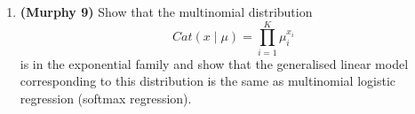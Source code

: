 \documentclass[letter,11pt]{article}
\newenvironment{solution}{
    \vspace{0.16in} {\bf Solution:}
    
}{
	\vspace{0.16in}
}
\begin{document}
\begin{enumerate}
\begin{solution}
        \begin{align*}
            Var(\theta; a, b) &= \mathbb{E}(\theta^2) - \mathbb{E}(\theta)^2 \\
                &= \int_0^1 \frac{\Gamma(a + b)}{\Gamma(a) \Gamma(b)} \theta^a (1 - \theta)^{b - 1} \dd{\theta} - \frac{a^2}{(a + b)^2} \\
                &= \left(\frac{\Gamma(a + 2)\Gamma(b)}{\Gamma(a + 2 + b)}\right) \left(\frac{\Gamma(a + b)}{\Gamma(a) \Gamma(b)}\right) - \frac{a^2}{(a + b)^2} \\
                &= \left(\frac{a(a + 1) \Gamma(a)\Gamma(b)}{(a + b)(a + b + 1) \Gamma(a + b)}\right) \left(\frac{\Gamma(a + b)}{\Gamma(a) \Gamma(b)}\right) - \frac{a^2}{(a + b)^2} \\
                &= \frac{a(a + 1)}{(a + b)(a + b + 1)} - \frac{a^2}{(a + b)^2} \\
                &= \frac{a(a + 1)(a + b) - a^2(a + b + 1)}{(a + b)^2(a + b + 1)} \\
                &= \frac{a^3 + a^2b + a^2 + ab + b - a^3 - a^2b - a^2}{(a + b)^2(a + b + 1)} \\
                &= \frac{ab}{(a + b)^2(a + b + 1)}
        \end{align*}
        Variance of $\theta$ is $\frac{ab}{(a + b)^2(a + b + 1)}$.
    \end{solution}

    \newpage


    \item \textbf{(Murphy 9)} Show that the multinomial distribution
    \[Cat(x \mid \mu) = \prod_{i=1}^K \mu_i^{x_i}\]
    is in the exponential family and show that the generalised linear model corresponding to this distribution is the same as multinomial logistic regression (softmax regression).


\end{enumerate}
\end{document}
